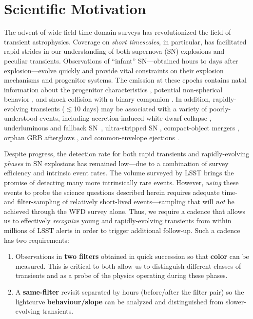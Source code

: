 \documentclass[12pt, letterpaper]{article}
\begin{document}
\section{Scientific Motivation}

The advent of wide-field time domain surveys has revolutionized the field of transient astrophysics. Coverage on \emph{short timescales}, in particular, has facilitated rapid strides in our understanding of both supernova (SN) explosions and peculiar transients. Observations of ``infant'' SN---obtained hours to days after explosion---evolve quickly and provide vital constraints on their explosion mechanisms and progenitor systems. The emission at these epochs contains natal information about the progenitor characteristics \citep{Nakar2010,Rabinak2011,Nugent2011}, potential non-spherical behavior \citep{Matzner2013,Salbi2014}, and shock collision with a binary companion \citep{Kasen2010}. In addition, rapidly-evolving transients ($\lesssim$10 days) may be associated with a variety of poorly-understood events, including accretion-induced white dwarf collapse \citep{Metzger2009}, underluminous and fallback SN~\citep{Moriya2010}, ultra-stripped SN \citep{Drout2013,Kasliwal2010,Tauris2015}, compact-object mergers \citep{Kasen2015,Metzger2010}, orphan GRB afterglows \citep{Totani2002}, and common-envelope ejections \citep{Blagorodnova2017}.


Despite progress, the detection rate for both rapid transients and rapidly-evolving \emph{phases} in SN explosions has remained low---due to a combination of survey efficiency and intrinsic event rates. The volume surveyed by LSST brings the promise of detecting many more intrinsically rare events. However, \emph{using} these events to probe the science questions described herein requires adequate time- and filter-sampling of relatively short-lived events---sampling that will \emph{not} be achieved through the WFD survey alone. Thus, we require a cadence that allows us to effectively \emph{recognize} young and rapidly-evolving transients from within millions of LSST alerts in order to trigger additional follow-up. Such a cadence has two requirements: 
\begin{enumerate}
    \item Observations in {\bf two filters} obtained in quick succession so that {\bf color} can be measured. This is critical to both allow us to distinguish different classes of transients and as a probe of the physics operating during these phases.
    \vspace{-0.1in}
    \item A {\bf same-filter} revisit separated by hours (before/after the filter pair) so the lightcurve {\bf behaviour/slope} can be analyzed and distinguished from slower-evolving transients.
\end{enumerate}
\end{document}
